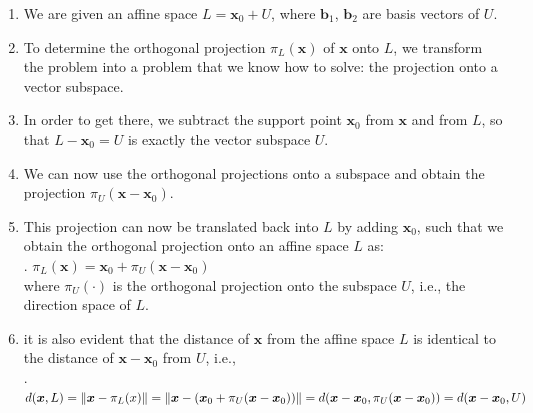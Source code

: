 \begin{enumerate}
    \item We are given an affine space $L = \bm{x}_0 + U$, where $\bm{b}_1$, $\bm{b}_2$ are basis vectors of $U$.
    \hfill \cite{mfml/book/mml/Deisenroth-Faisal-Ong}

    \item To determine the orthogonal projection $\pi_L(\bm{x})$ of $\bm{x}$ onto $L$, we transform the problem into a problem that we know how to solve: the projection onto a vector subspace.
    \hfill \cite{mfml/book/mml/Deisenroth-Faisal-Ong}

    \item  In order to get there, we subtract the support point $\bm{x}_0$ from $\bm{x}$ and from $L$, so that $L - \bm{x}_0 = U$ is exactly the vector subspace $U$.
    \hfill \cite{mfml/book/mml/Deisenroth-Faisal-Ong}

    \item We can now use the orthogonal projections onto a subspace and obtain the projection $\pi_U (\bm{x} - \bm{x}_0)$.
    \hfill \cite{mfml/book/mml/Deisenroth-Faisal-Ong}

    \item This projection can now be translated back into $L$ by adding $\bm{x}_0$, such that we obtain the orthogonal projection onto an affine space $L$ as:
    \hfill \cite{mfml/book/mml/Deisenroth-Faisal-Ong}
    \\
    .\hfill
    $
        \pi_L(\bm{x}) = \bm{x}_0 + \pi_U (\bm{x} - \bm{x}_0)
    $
    \hfill \cite{mfml/book/mml/Deisenroth-Faisal-Ong}
    \\
    where $\pi_U (\cdot)$ is the orthogonal projection onto the subspace $U$, i.e., the direction space of $L$.
    \hfill \cite{mfml/book/mml/Deisenroth-Faisal-Ong}

    \item it is also evident that the distance of $\bm{x}$ from the affine space $L$ is identical to the distance of $\bm{x} - \bm{x}_0$ from $U$, i.e.,
    \hfill \cite{mfml/book/mml/Deisenroth-Faisal-Ong}
    \\
    .\hfill
    $
        d(\bm{x}, L)
        = \left\| \bm{x} - \pi_L(x) \right\|
        = \left\| \bm{x} - (\bm{x}_0 + \pi_U (\bm{x} - \bm{x}_0)) \right\|
        = d(\bm{x} - \bm{x}_0, \pi_U (\bm{x} - \bm{x}_0))
        = d(\bm{x} - \bm{x}_0, U)
    $
    \hfill \cite{mfml/book/mml/Deisenroth-Faisal-Ong}
\end{enumerate}




